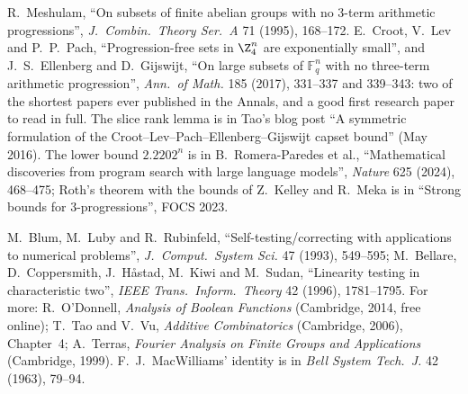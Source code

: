 R.~Meshulam, ``On subsets of finite abelian groups with no 3-term arithmetic progressions'', \emph{J.\ Combin.\ Theory Ser.\ A} 71 (1995),
168--172. E.~Croot, V.~Lev and P.~P.~Pach, ``Progression-free sets in $\Z_4^n$ are exponentially small'', and J.~S.~Ellenberg and D.~Gijswijt,
``On large subsets of $\mathbb F_q^n$ with no three-term arithmetic progression'', \emph{Ann.\ of Math.} 185 (2017), 331--337 and 339--343: two
of the shortest papers ever published in the Annals, and a good first research paper to read in full. The slice rank lemma is in Tao's blog
post ``A symmetric formulation of the Croot--Lev--Pach--Ellenberg--Gijswijt capset bound'' (May 2016). The lower bound $2.2202^n$ is in
B.~Romera-Paredes et al., ``Mathematical discoveries from program search with large language models'', \emph{Nature} 625 (2024), 468--475;
Roth's theorem with the bounds of Z.~Kelley and R.~Meka is in ``Strong bounds for 3-progressions'', FOCS 2023.

M.~Blum, M.~Luby and R.~Rubinfeld, ``Self-testing/correcting with applications to numerical problems'', \emph{J.\ Comput.\ System Sci.} 47
(1993), 549--595; M.~Bellare, D.~Coppersmith, J.~H\aa stad, M.~Kiwi and M.~Sudan, ``Linearity testing in characteristic two'', \emph{IEEE
Trans.\ Inform.\ Theory} 42 (1996), 1781--1795. For more: R.~O'Donnell, \emph{Analysis of Boolean Functions} (Cambridge, 2014, free online);
T.~Tao and V.~Vu, \emph{Additive Combinatorics} (Cambridge, 2006), Chapter~4; A.~Terras, \emph{Fourier Analysis on Finite Groups and
Applications} (Cambridge, 1999). F.~J.~MacWilliams' identity is in \emph{Bell System Tech.\ J.} 42 (1963), 79--94.

